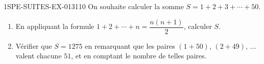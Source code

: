 \begin{exercice}{1SPE-SUITES-EX-013}{1}{10}
On souhaite calculer la somme $S = 1 + 2 + 3 + \cdots + 50$.
\begin{enumerate}
  \item En appliquant la formule $1 + 2 + \cdots + n = \dfrac{n(n+1)}{2}$, calculer $S$.
  \item Vérifier que $S = 1275$ en remarquant que les paires $(1 + 50)$, $(2 + 49)$, $\ldots$ valent chacune $51$, et en comptant le nombre de telles paires.
\end{enumerate}
\end{exercice}
